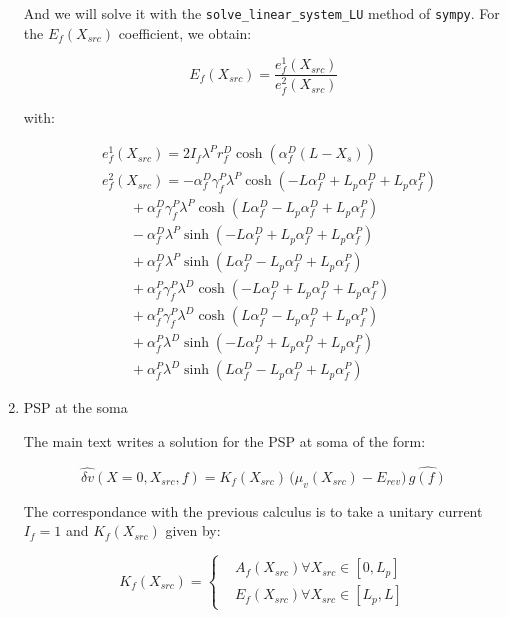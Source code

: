 \documentclass[colorlinks]{article}
\begin{document}
\begin{enumerate}
And we will solve it with the \texttt{solve\_linear\_system\_LU} method of
\texttt{sympy}. For the $E_f(X_{src})$ coefficient, we obtain:

\begin{equation}
E_f(X_{src}) = \frac{e^1_f(X_{src})}{e^2_f(X_{src})}
\end{equation}

with:

\begin{equation}
\begin{split}
& e^1_f(X_{src}) = 2 I_{f} \lambda^{P} r^{D}_{f} \cosh{\left (\alpha^{D}_{f} \left(L - X_{s}\right) \right )} \\
& e^2_f(X_{src}) = - \alpha^{D}_{f} \gamma^{P}_{f} \lambda^{P} \cosh{\left (- L \alpha^{D}_{f} + L_{p} \alpha^{D}_{f} + L_{p} \alpha^{P}_{f} \right )} \\
& \qquad + \alpha^{D}_{f} \gamma^{P}_{f} \lambda^{P} \cosh{\left (L \alpha^{D}_{f} - L_{p} \alpha^{D}_{f} + L_{p} \alpha^{P}_{f} \right )}  \\
& \qquad- \alpha^{D}_{f} \lambda^{P} \sinh{\left (- L \alpha^{D}_{f} + L_{p} \alpha^{D}_{f} + L_{p} \alpha^{P}_{f} \right )}  \\
& \qquad+ \alpha^{D}_{f} \lambda^{P} \sinh{\left (L \alpha^{D}_{f} - L_{p} \alpha^{D}_{f} + L_{p} \alpha^{P}_{f} \right )}  \\
& \qquad+ \alpha^{P}_{f} \gamma^{P}_{f} \lambda^{D} \cosh{\left (- L \alpha^{D}_{f} + L_{p} \alpha^{D}_{f} + L_{p} \alpha^{P}_{f} \right )}  \\
& \qquad+ \alpha^{P}_{f} \gamma^{P}_{f} \lambda^{D} \cosh{\left (L \alpha^{D}_{f} - L_{p} \alpha^{D}_{f} + L_{p} \alpha^{P}_{f} \right )}  \\
& \qquad+ \alpha^{P}_{f} \lambda^{D} \sinh{\left (- L \alpha^{D}_{f} + L_{p} \alpha^{D}_{f} + L_{p} \alpha^{P}_{f} \right )}  \\
& \qquad+ \alpha^{P}_{f} \lambda^{D} \sinh{\left (L \alpha^{D}_{f} - L_{p} \alpha^{D}_{f} + L_{p} \alpha^{P}_{f} \right )}
\end{split}
\end{equation}


\item PSP at the soma
\label{sec-3-0-0-3}

The main text writes a solution for the PSP at soma of the form:

\begin{equation}
\hat{\delta v}(X=0, X_{src}, f) = K_f(X_{src}) \, 
\big(\mu_v(X_{src})-E_{rev}\big) \,  \hat{g(f)} 
\end{equation}

The correspondance with the previous calculus is to take a unitary
current \(I_f=1\) and \( K_f(X_{src}) \) given by:

\begin{equation}
K_f(X_{src}) = 
\left\{
\begin{split}
& A_f(X_{src}) \forall X_{src} \in [0,L_p] \\
& E_f(X_{src}) \forall X_{src} \in [L_p, L]
\end{split}
\right.
\end{equation}
\end{enumerate}
\end{document}
